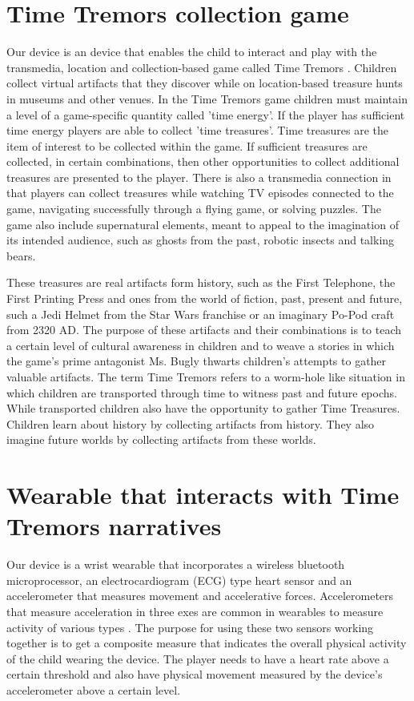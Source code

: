 \documentclass{SIGCHI2015LaTex/sigchi}
\begin{document}
\section{Time Tremors collection game}
Our device is an device that enables the child to interact and play with the transmedia, location and collection-based game called Time Tremors \cite{tindale2014wearable}. Children collect virtual artifacts that they discover while on location-based treasure hunts in museums and other venues. In the Time Tremors game children must maintain a level of a game-specific quantity called 'time energy'. If the player has sufficient time energy players are able to collect 'time treasures'. Time treasures are the item of interest to be collected within the game. If sufficient treasures are collected, in certain combinations, then other opportunities to collect additional treasures are presented to the player. There is also a transmedia connection in that players can collect treasures while watching TV episodes connected to the game, navigating successfully through a flying game, or solving puzzles. The game also include supernatural elements, meant to appeal to the imagination of its intended audience, such as ghosts from the past, robotic insects and talking bears.

These treasures are real artifacts form history, such as the First Telephone, the First Printing Press and ones from the world of fiction, past, present and future, such a Jedi Helmet from the Star Wars franchise or an imaginary Po-Pod craft from 2320 AD. The purpose of these artifacts and their combinations is to  teach a certain level of cultural awareness in children and to weave a stories in which the game's prime antagonist Ms. Bugly thwarts children's attempts to gather valuable artifacts. The term Time Tremors refers to a worm-hole like situation in which children are transported through time to witness past and future epochs. While transported children also have the opportunity to gather Time Treasures. Children learn about history by collecting artifacts from history. They also imagine future worlds by collecting artifacts from these worlds. 

\section{Wearable that interacts with Time Tremors narratives}
Our device is a wrist wearable that incorporates a wireless bluetooth microprocessor, an electrocardiogram (ECG) type heart sensor and an accelerometer that measures movement and accelerative forces. Accelerometers that measure acceleration in three exes are common in wearables to measure activity of various types \cite{alshurafa2014designing}. The purpose for using these two sensors working together is to get a composite measure that indicates the overall physical activity of the child wearing the device. The player needs to have a heart rate above a certain threshold and also have physical movement measured by the device's accelerometer above a certain level. 
\end{document}
